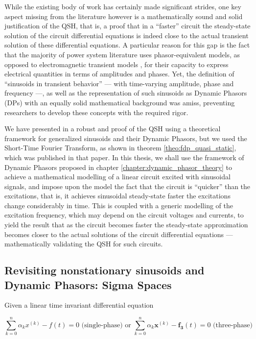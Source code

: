 	While the existing body of work has certainly made significant strides, one key aspect missing from the literature however is a mathematically sound and solid justification of the QSH, that is, a proof that in a ``faster'' circuit the steady-state solution of the circuit differential equations is indeed close to the actual transient solution of these differential equations. A particular reason for this gap is the fact that the majority of power system literature uses phasor-equivalent models, as opposed to electromagnetic transient models , for their capacity to express electrical quantities in terms of amplitudes and phases. Yet, the definition of ``sinusoids in transient behavior'' — with time-varying amplitude, phase and frequency —, as well as the representation of such sinusoids as Dynamic Phasors (DPs) with an equally solid mathematical background was amiss, preventing researchers to develop these concepts with the required rigor.

	We have presented in \cite{volpatoDynamicPhasorTransform2022} a robust and proof of the QSH using a theoretical framework for generalized sinusoids and their Dynamic Phasors, but we used the Short-Time Fourier Transform, as shown in theorem \ref{theo:fdp_quasi_static}, which was published in that paper. In this thesis, we shall use the framework of Dynamic Phasors proposed in chapter \ref{chapter:dynamic_phasor_theory} to achieve a mathematical modelling of a linear circuit excited with sinusoidal signals, and impose upon the model the fact that the circuit is ``quicker'' than the excitations, that is, it achieves sinusoidal steady-state faster the excitations change considerably in time. This is coupled with a generic modelling of the excitation frequency, which may depend on the circuit voltages and currents, to yield the result that as the circuit becomes faster the steady-state approximation becomes closer to the actual solutions of the circuit differential equations — mathematically validating the QSH for such circuits.

\subsection{Revisiting nonstationary sinusoids and Dynamic Phasors: Sigma Spaces} %

	Given a linear time invariant differential equation

\begin{equation} \sum\limits_{k=0}^{n} \alpha_k x^{\left(k\right)} - f(t) = 0 \text{ (single-phase) or }\sum\limits_{k=0}^{n} \alpha_k \mathbf{x}^{\left(k\right)} - \mathbf{f_3}(t) = 0 \text{ (three-phase)}\end{equation}

